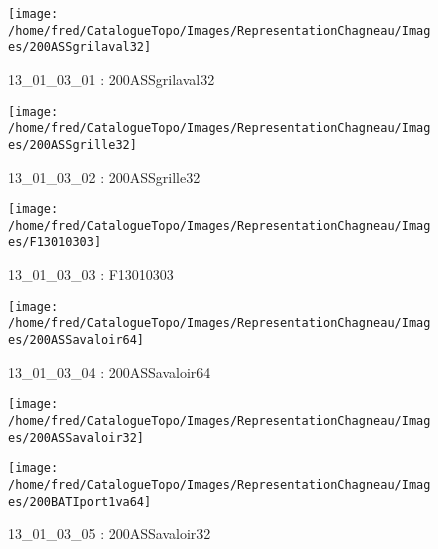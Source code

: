 \documentclass[12pt,titlepage,oneside]{book}
\begin{document}
\begin{figure}[h!]
  \hfill         %
  \begin{minipage}[t]{3cm}
    \begin{center}
      \texttt{[image: /home/fred/CatalogueTopo/Images/RepresentationChagneau/Images/200ASSgrilaval32]}
      \caption[200ASSgrilaval32]{\label{} 13\_01\_03\_01 : 200ASSgrilaval32}
    \end{center}
  \end{minipage}
  \begin{minipage}[t]{3cm}
    \begin{center}
      \texttt{[image: /home/fred/CatalogueTopo/Images/RepresentationChagneau/Images/200ASSgrille32]}
      \caption[200ASSgrille32]{\label{} 13\_01\_03\_02 : 200ASSgrille32}
    \end{center}
  \end{minipage}
  \begin{minipage}[t]{3cm}
    \begin{center}
      \texttt{[image: /home/fred/CatalogueTopo/Images/RepresentationChagneau/Images/F13010303]}
      \caption[F13010303]{\label{} 13\_01\_03\_03 : F13010303}
    \end{center}
  \end{minipage}
  \begin{minipage}[t]{3cm}
    \begin{center}
      \texttt{[image: /home/fred/CatalogueTopo/Images/RepresentationChagneau/Images/200ASSavaloir64]}
      \caption[200ASSavaloir64]{\label{} 13\_01\_03\_04 : 200ASSavaloir64}
    \end{center}
  \end{minipage}
  \begin{minipage}[t]{3cm}
    \begin{center}
      \texttt{[image: /home/fred/CatalogueTopo/Images/RepresentationChagneau/Images/200ASSavaloir32]}
      \caption[200ASSavaloir32]{\label{} 13\_01\_03\_05 : 200ASSavaloir32}
    \end{center}
  \end{minipage}
  \begin{minipage}[t]{3cm}
    \begin{center}
      \texttt{[image: /home/fred/CatalogueTopo/Images/RepresentationChagneau/Images/200BATIport1va64]}

\end{center}
\end{minipage}
\end{figure}
\end{document}
